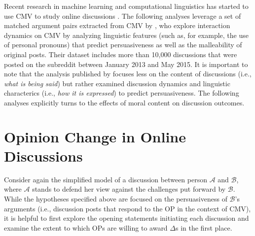 Recent research in machine learning and computational linguistics has started to use CMV to study online discussions \citep{wei2016post,hidey2017analyzing}. The following analyses leverage a set of matched argument pairs extracted from CMV by \citet{tan2016winning}, who explore interaction dynamics on CMV by analyzing linguistic features (such as, for example, the use of personal pronouns) that predict persuasiveness as well as the malleability of original posts. Their dataset includes more than 10,000 discussions that were posted on the subreddit between January 2013 and May 2015. It is important to note that the analysis published by \citet{tan2016winning} focuses less on the content of discussions (i.e., \textit{what is being said}) but rather examined discussion dynamics and linguistic characterics (i.e., \textit{how it is expressed}) to predict persuasiveness. The following analyses explicitly turns to the effects of moral content on discussion outcomes.




\section{Opinion Change in Online Discussions}

Consider again the simplified model of a discussion between person $\mathcal{A}$ and $\mathcal{B}$, where $\mathcal{A}$ stands to defend her view against the challenges put forward by $\mathcal{B}$. While the hypotheses specified above are focused on the persuasiveness of $\mathcal{B}$'s arguments (i.e., discussion posts that respond to the OP in the context of CMV), it is helpful to first explore the opening statements initiating each discussion and examine the extent to which OPs are willing to award $\Delta$s in the first place.

